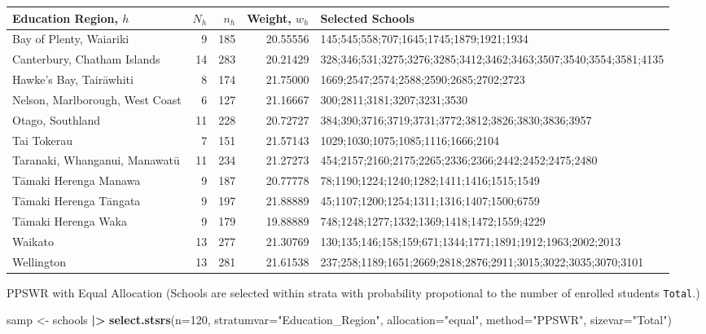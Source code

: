 \documentclass[
]{book}
\newenvironment{Shaded}{\begin{snugshade}}{\end{snugshade}}
\newcommand{\AttributeTok}[1]{\textcolor[rgb]{0.13,0.29,0.53}{#1}}
\newcommand{\DecValTok}[1]{\textcolor[rgb]{0.00,0.00,0.81}{#1}}
\newcommand{\FunctionTok}[1]{\textcolor[rgb]{0.13,0.29,0.53}{\textbf{#1}}}
\newcommand{\NormalTok}[1]{#1}
\newcommand{\OtherTok}[1]{\textcolor[rgb]{0.56,0.35,0.01}{#1}}
\newcommand{\SpecialCharTok}[1]{\textcolor[rgb]{0.81,0.36,0.00}{\textbf{#1}}}
\newcommand{\StringTok}[1]{\textcolor[rgb]{0.31,0.60,0.02}{#1}}
\begin{document}
\begin{table}
\centering
\begin{tabular}[t]{l|r|r|r|l}
\hline
Education Region, $h$ & $N_h$ & $n_h$ & Weight, $w_h$ & Selected Schools\\
\hline
Bay of Plenty, Waiariki & 9 & 185 & 20.55556 & 145;545;558;707;1645;1745;1879;1921;1934\\
\hline
Canterbury, Chatham Islands & 14 & 283 & 20.21429 & 328;346;531;3275;3276;3285;3412;3462;3463;3507;3540;3554;3581;4135\\
\hline
Hawke's Bay, Tairāwhiti & 8 & 174 & 21.75000 & 1669;2547;2574;2588;2590;2685;2702;2723\\
\hline
Nelson, Marlborough, West Coast & 6 & 127 & 21.16667 & 300;2811;3181;3207;3231;3530\\
\hline
Otago, Southland & 11 & 228 & 20.72727 & 384;390;3716;3719;3731;3772;3812;3826;3830;3836;3957\\
\hline
Tai Tokerau & 7 & 151 & 21.57143 & 1029;1030;1075;1085;1116;1666;2104\\
\hline
Taranaki, Whanganui, Manawatū & 11 & 234 & 21.27273 & 454;2157;2160;2175;2265;2336;2366;2442;2452;2475;2480\\
\hline
Tāmaki Herenga Manawa & 9 & 187 & 20.77778 & 78;1190;1224;1240;1282;1411;1416;1515;1549\\
\hline
Tāmaki Herenga Tāngata & 9 & 197 & 21.88889 & 45;1107;1200;1254;1311;1316;1407;1500;6759\\
\hline
Tāmaki Herenga Waka & 9 & 179 & 19.88889 & 748;1248;1277;1332;1369;1418;1472;1559;4229\\
\hline
Waikato & 13 & 277 & 21.30769 & 130;135;146;158;159;671;1344;1771;1891;1912;1963;2002;2013\\
\hline
Wellington & 13 & 281 & 21.61538 & 237;258;1189;1651;2669;2818;2876;2911;3015;3022;3035;3070;3101\\
\hline
\end{tabular}
\end{table}

PPSWR with Equal Allocation (Schools are selected within strata with probability
propotional to the number of enrolled students \texttt{Total}.)

\begin{Shaded}
\begin{Highlighting}[]
\NormalTok{samp }\OtherTok{\textless{}{-}}\NormalTok{ schools }\SpecialCharTok{|\textgreater{}} \FunctionTok{select.stsrs}\NormalTok{(}\AttributeTok{n=}\DecValTok{120}\NormalTok{,  }
                                \AttributeTok{stratumvar=}\StringTok{"Education\_Region"}\NormalTok{, }
                                \AttributeTok{allocation=}\StringTok{"equal"}\NormalTok{, }
                                \AttributeTok{method=}\StringTok{"PPSWR"}\NormalTok{, }\AttributeTok{sizevar=}\StringTok{"Total"}\NormalTok{)}
\end{Highlighting}
\end{Shaded}
\end{document}
